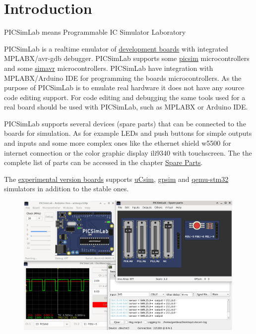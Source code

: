 \chapter{Introduction}


PICSimLab means Programmable IC Simulator Laboratory

PICSimLab is a realtime emulator of \hyperlink{def:boards}{development boards} with integrated 
MPLABX/avr-gdb debugger. 
PICSimLab supports some \href{https://github.com/lcgamboa/picsim}{picsim} microcontrollers and 
some \href{https://github.com/buserror/simavr}{simavr} microcontrollers. 
PICSimLab have integration with MPLABX/Arduino IDE for programming the boards microcontrollers.
As the purpose of PICSimLab is to emulate real hardware it does not have any source code editing support.
For code editing and debugging the same tools used for a real board should be used with PICSimLab, such as MPLABX or Arduino IDE. 

PICSimLab supports several devices (spare parts) that can be connected to the boards for simulation. 
As for example LEDs and push buttons for simple outputs and inputs and some more complex ones like the ethernet 
shield w5500 for internet connection or the color graphic display ili9340 with touchscreen. 
The the complete list of parts can be accessed in the chapter \hyperlink{def:spare}{Spare Parts}. 

The \hyperlink{def:eboards}{experimental version boards} supports 
\href{http://mazsola.iit.uni-miskolc.hu/\%7edrdani/embedded/ucsim/}{uCsim}, 
\href{http://gpsim.sourceforge.net/}{gpsim} and \href{http://beckus.github.io/qemu_stm32/}{qemu-stm32} simulators
in addition to the stable ones.


\begin{figure}[H]
\center
\includegraphics[width=0.99\textwidth]{img/screenshot.png} 
\end{figure} 
